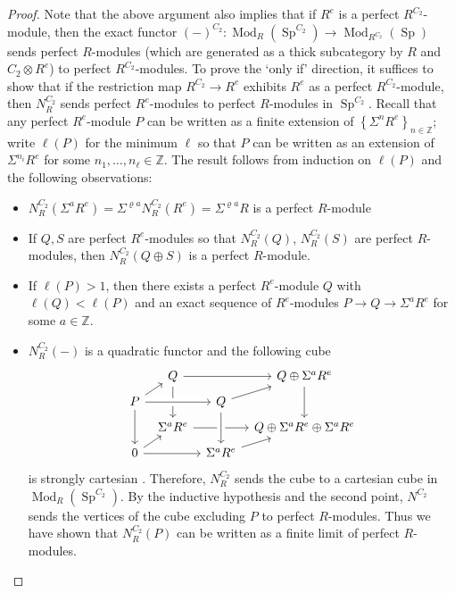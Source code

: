 \documentclass{article}
\DeclareMathOperator{\Mod}{Mod} %
\DeclareMathOperator{\Spectra}{Sp} %
\renewcommand{\rho}{\varrho}
\newcommand{\ZZ}{\mathbb{Z}}
\theoremstyle{definition}
\begin{document}
\begin{proof}
    Note that the above argument also implies that if $ R^e $ is a perfect $ R^{C_2} $-module, then the exact functor $ (-)^{C_2} \colon \Mod_R\left(\Spectra^{C_2}\right) \to \Mod_{R^{C_2}}\left(\Spectra\right) $ sends perfect $ R $-modules (which are generated as a thick subcategory by $ R $ and $ C_2 \otimes R^e $) to perfect $ R^{C_2} $-modules. 
    To prove the `only if' direction, it suffices to show that if the restriction map $ R^{C_2} \to R^e $ exhibits $ R^e $ as a perfect $ R^{C_2} $-module, then $ N^{C_2}_R $ sends perfect $ R^e $-modules to perfect $ R $-modules in $ \Spectra^{C_2} $. 
    Recall that any perfect $ R^e $-module $ P $ can be written as a finite extension of $ \left\{\Sigma^n R^e \right\}_{n \in \ZZ} $; write $ \ell(P) $ for the minimum $ \ell $ so that $ P $ can be written as an extension of $ \Sigma^{n_i}R^e $ for some $ n_1, \ldots, n_\ell \in \ZZ $. 
    The result follows from induction on $ \ell(P) $ and the following observations:  
    \begin{itemize} 
        \item $ N^{C_2}_R(\Sigma^a R^{e}) = \Sigma^{\rho a} N^{C_2}_R(R^e) = \Sigma^{\rho a} R $ is a perfect $ R $-module  
        \item If $ Q, S $ are perfect $ R^e $-modules so that $ N^{C_2}_R(Q) $, $ N^{C_2}_R(S) $ are perfect $ R $-modules, then $ N^{C_2}_R(Q \oplus S) $ is a perfect $ R $-module. 
        \item If $ \ell(P) > 1 $, then there exists a perfect $ R^e $-module $ Q $ with $ \ell(Q) < \ell(P) $ and an exact sequence of $ R^e $-modules $ P \to Q \to \Sigma^a R^e $ for some $ a \in \ZZ $. 
        \item $ N^{C_2}_R(-) $ is a quadratic functor and the following cube
        \begin{equation*}
        \begin{tikzcd}[row sep=tiny, column sep=tiny]
            & Q \ar[rr] \ar[dd] & & Q \oplus \Sigma^a R^e \ar[dd] \\
            P \ar[rr,crossing over] \ar[dd] \ar[ru] & & Q \ar[ru] & \\
            & \Sigma^a R^e \ar[rr] & & Q \oplus \Sigma^a R^e \oplus \Sigma^a R^e \\
            0 \ar[rr] \ar[ru] & & \Sigma^a R^e \ar[from=2-3,crossing over] \ar[ru] & 
        \end{tikzcd}     
        \end{equation*} 
        is strongly cartesian \cite[Corollary 6.1.1.16]{LurHA}. 
        Therefore, $ N^{C_2}_R $ sends the cube to a cartesian cube in $ \Mod_R\left(\Spectra^{C_2}\right) $. 
        By the inductive hypothesis and the second point, $ N^{C_2} $ sends the vertices of the cube excluding $ P $ to perfect $ R $-modules. 
        Thus we have shown that $ N^{C_2}_R(P) $ can be written as a finite limit of perfect $ R $-modules. \qedhere
    \end{itemize}  
\end{proof}
\end{document}
